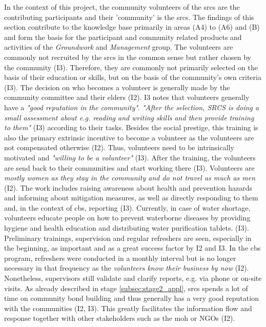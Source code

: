 In the context of this project, the community volunteers of the \acrshort{srcs} are the contributing participants and their 'community' is the \acrshort{srcs}. The findings of this section contribute to the knowledge base primarily in areas (A4) to (A6) and (B) and form the basis for the participant and community related products and activities of the \textit{Groundwork} and \textit{Management} group. The volunteers are commonly not recruited by the \acrshort{srcs} in the common sense but rather chosen by the community (I3). Therefore, they are commonly not primarily selected on the basis of their education or skills, but on the basis of the community's own criteria (I3). The decision on who becomes a volunteer is generally made by the community committee and their elders (I2). I3 notes that volunteers generally have a \textit{"good reputation in the community"}. \textit{"After the selection, SRCS is doing a small assessment about e.g. reading and writing skills and then provide training to them"} (I3) according to their tasks. Besides the social prestige, this training is also the primary extrinsic incentive to become a volunteer as the volunteers are not compensated otherwise (I2). Thus, volunteers need to be intrinsically motivated and \textit{"willing to be a volunteer"} (I3). After the training, the volunteers are send back to their communities and start working there (I3). Volunteers are \textit{mostly women as they stay in the community and do not travel as much as men} (I2). The work includes raising awareness about health and prevention hazards and informing about mitigation measures, as well as directly responding to them and, in the context of \acrshort{cbs}, reporting (I3). Currently, in case of water shortage, volunteers educate people on how to prevent waterborne diseases by providing hygiene and health education and distributing water purification tablets. (I3).\newline
Preliminary trainings, supervision and regular refreshers are seen, especially in the beginning, as important and as a great success factor by I2 and I3. In the \acrshort{cbs} program, refreshers were conducted in a monthly interval but  is no longer necessary in that frequency as the \textit{volunteers know their business by now} (I2). Nonetheless, supervisors still validate and clarify reports, e.g. via phone or on-site visits. As already described in stage \ref*{subsec:stage2_appl}, \acrshort{srcs} spends a lot of time on community bond building and thus generally has a very good reputation with the communities (I2, I3). This greatly facilitates the information flow and response together with other stakeholders such as the \acrshort{moh} or NGOs (I2). 

